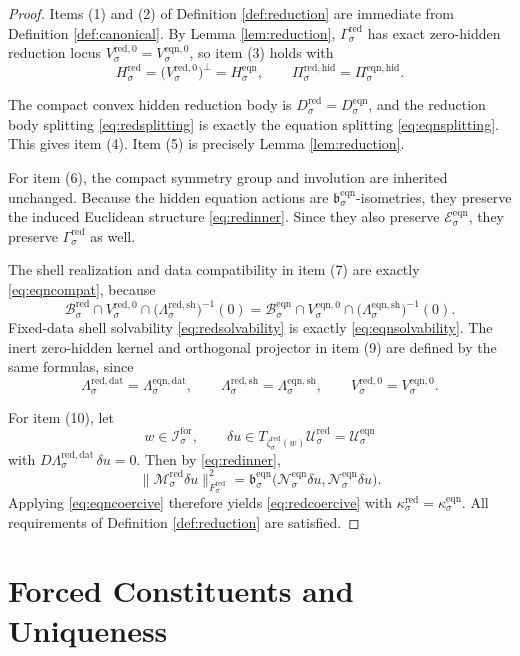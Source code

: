 \documentclass[11pt]{article}
\newcommand{\ForSpace}[1]{\mathcal I_{#1}^{\mathrm{for}}}
\newcommand{\RedSpace}[1]{\mathcal U_{#1}^{\mathrm{red}}}
\newcommand{\RedBody}[1]{\mathcal B_{#1}^{\mathrm{red}}}
\newcommand{\RedData}[1]{\Lambda_{#1}^{\mathrm{red,dat}}}
\newcommand{\RedShell}[1]{\Lambda_{#1}^{\mathrm{red,sh}}}
\newcommand{\RedTarget}[1]{F_{#1}^{\mathrm{red}}}
\newcommand{\RedMap}[1]{\Gamma_{#1}^{\mathrm{red}}}
\newcommand{\RedZero}[1]{V_{#1}^{\mathrm{red},0}}
\newcommand{\RedHidden}[1]{H_{#1}^{\mathrm{red}}}
\newcommand{\RedHiddenBody}[1]{D_{#1}^{\mathrm{red}}}
\newcommand{\RedProj}[1]{\Pi_{#1}^{\mathrm{red,hid}}}
\newcommand{\RedLin}[1]{\mathcal M_{#1}^{\mathrm{red}}}
\newcommand{\RedEmbed}[1]{\zeta_{#1}^{\mathrm{red}}}
\newcommand{\EqnSpace}[1]{\mathcal U_{#1}^{\mathrm{eqn}}}
\newcommand{\EqnBody}[1]{\mathcal B_{#1}^{\mathrm{eqn}}}
\newcommand{\EqnData}[1]{\Lambda_{#1}^{\mathrm{eqn,dat}}}
\newcommand{\EqnShell}[1]{\Lambda_{#1}^{\mathrm{eqn,sh}}}
\newcommand{\EqnPair}[1]{\mathfrak b_{#1}^{\mathrm{eqn}}}
\newcommand{\EqnResidual}[1]{\mathcal E_{#1}^{\mathrm{eqn}}}
\newcommand{\EqnZero}[1]{V_{#1}^{\mathrm{eqn},0}}
\newcommand{\EqnHidden}[1]{H_{#1}^{\mathrm{eqn}}}
\newcommand{\EqnHiddenBody}[1]{D_{#1}^{\mathrm{eqn}}}
\newcommand{\EqnProj}[1]{\Pi_{#1}^{\mathrm{eqn,hid}}}
\newcommand{\EqnLin}[1]{\mathcal N_{#1}^{\mathrm{eqn}}}
\begin{document}
\begin{proof}
Items (1) and (2) of Definition \ref{def:reduction} are immediate from Definition \ref{def:canonical}. By Lemma \ref{lem:reduction}, \(\RedMap{\sigma}\) has exact zero-hidden reduction locus \(\RedZero{\sigma}=\EqnZero{\sigma}\), so item (3) holds with
\[
\RedHidden{\sigma}
=
\bigl(\RedZero{\sigma}\bigr)^{\perp}
=
\EqnHidden{\sigma},
\qquad
\RedProj{\sigma}=\EqnProj{\sigma}.
\]

The compact convex hidden reduction body is \(\RedHiddenBody{\sigma}=\EqnHiddenBody{\sigma}\), and the reduction body splitting \eqref{eq:redsplitting} is exactly the equation splitting \eqref{eq:eqnsplitting}. This gives item (4). Item (5) is precisely Lemma \ref{lem:reduction}.

For item (6), the compact symmetry group and involution are inherited unchanged. Because the hidden equation actions are \(\EqnPair{\sigma}\)-isometries, they preserve the induced Euclidean structure \eqref{eq:redinner}. Since they also preserve \(\EqnResidual{\sigma}\), they preserve \(\RedMap{\sigma}\) as well.

The shell realization and data compatibility in item (7) are exactly \eqref{eq:eqncompat}, because
\[
\RedBody{\sigma}\cap\RedZero{\sigma}\cap\bigl(\RedShell{\sigma}\bigr)^{-1}(0)
=
\EqnBody{\sigma}\cap\EqnZero{\sigma}\cap\bigl(\EqnShell{\sigma}\bigr)^{-1}(0).
\]
Fixed-data shell solvability \eqref{eq:redsolvability} is exactly \eqref{eq:eqnsolvability}. The inert zero-hidden kernel and orthogonal projector in item (9) are defined by the same formulas, since
\[
\RedData{\sigma}=\EqnData{\sigma},
\qquad
\RedShell{\sigma}=\EqnShell{\sigma},
\qquad
\RedZero{\sigma}=\EqnZero{\sigma}.
\]

For item (10), let
\[
w\in\ForSpace{\sigma},
\qquad
\delta u\in T_{\RedEmbed{\sigma}(w)}\RedSpace{\sigma}=\EqnSpace{\sigma}
\]
with \(D\RedData{\sigma}\,\delta u=0\). Then by \eqref{eq:redinner},
\[
\|\RedLin{\sigma}\delta u\|_{\RedTarget{\sigma}}^{2}
=
\EqnPair{\sigma}\bigl(\EqnLin{\sigma}\delta u,\EqnLin{\sigma}\delta u\bigr).
\]
Applying \eqref{eq:eqncoercive} therefore yields \eqref{eq:redcoercive} with \(\kappa_{\sigma}^{\mathrm{red}}=\kappa_{\sigma}^{\mathrm{eqn}}\). All requirements of Definition \ref{def:reduction} are satisfied.
\end{proof}

\section{Forced Constituents and Uniqueness}
\end{document}
